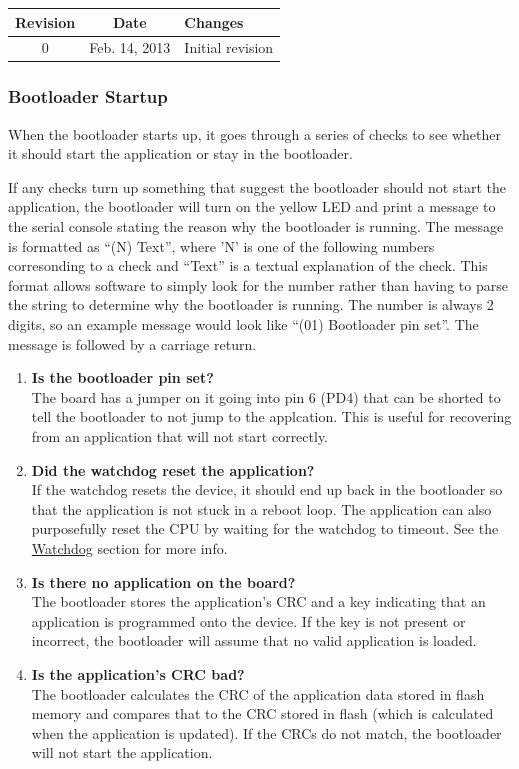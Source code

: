 \documentclass{article}
\begin{document}
\begin{center}
    \begin{tabular}{c|c|p{}}
        Revision & Date & Changes \\
        \hline
        0 & Feb. 14, 2013 & Initial revision \\
    \end{tabular}
\end{center}

\subsubsection{Bootloader Startup} \label{sssec:FWBootStartup}
When the bootloader starts up, it goes through a series of checks to see whether it should start the
application or stay in the bootloader.

If any checks turn up something that suggest the bootloader should not start the application, the
bootloader will turn on the yellow LED and print a message to the serial console stating the reason
why the bootloader is running.  The message is formatted as ``(N) Text'', where 'N' is one of the
following numbers corresonding to a check and ``Text'' is a textual explanation of the check.  This
format allows software to simply look for the number rather than having to parse the string to
determine why the bootloader is running.  The number is always 2 digits, so an example message would
look like ``(01) Bootloader pin set''.  The message is followed by a carriage return.

\begin{enumerate}
  \item \textbf{Is the bootloader pin set?} \\
    The board has a jumper on it going into pin 6 (PD4) that can be shorted to tell the bootloader
    to not jump to the applcation.  This is useful for recovering from an application that will
    not start correctly.
  \item \textbf{Did the watchdog reset the application?} \\
    If the watchdog resets the device, it should end up back in the bootloader so that the
    application is not stuck in a reboot loop.  The application can also purposefully reset the
    CPU by waiting for the watchdog to timeout.  See the \hyperref[ssec:FWWatchdog]{Watchdog}
    section for more info.
  \item \textbf{Is there no application on the board?} \\
    The bootloader stores the application's CRC and a key indicating that an application is
    programmed onto the device.  If the key is not present or incorrect, the bootloader will
    assume that no valid application is loaded.
  \item \textbf{Is the application's CRC bad?} \\
    The bootloader calculates the CRC of the application data stored in flash memory and compares
    that to the CRC stored in flash (which is calculated when the application is updated).  If the
    CRCs do not match, the bootloader will not start the application.
\end{enumerate}
\end{document}
